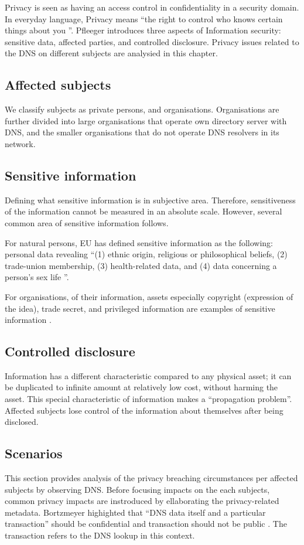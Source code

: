 Privacy is seen as having an access control in confidentiality in a security domain.
In everyday language, Privacy means ``the right to control who knows certain things about you \cite{securityincomputing}''.
Pfleeger introduces three aspects of Information security: sensitive data, affected parties, and controlled disclosure.
Privacy issues related to the DNS on different subjects are analysied in this chapter.

\subsection{Affected subjects}
We classify subjects as private persons, and organisations. Organisations are further divided into large organisations that operate own directory server with DNS, and the smaller organisations that do not operate DNS resolvers in its network.

\subsection{Sensitive information}\label{sensitiveinformation}
Defining what sensitive information is in subjective area.
Therefore, sensitiveness of the information cannot be measured in an absolute scale. However, several common area of sensitive information follows.

For natural persons, EU has defined sensitive information as the following: personal data revealing ``(1) ethnic origin, religious or philosophical beliefs, (2) trade-union membership, (3) health-related data, and (4) data concerning a person's sex life \cite{GDPR}''.

For organisations, of their information, assets especially copyright (expression of the idea), trade secret, and privileged information are examples of sensitive information \cite{securityincomputing}.

\subsection{Controlled disclosure}
Information has a different characteristic compared to any physical asset; it can be duplicated to infinite amount at relatively low cost, without harming the asset.
This special characteristic of information makes a ``propagation problem''.
Affected subjects lose control of the information about themselves after being disclosed.

\subsection{Scenarios}
This section provides analysis of the privacy breaching circumstances per affected subjects by observing DNS. Before focusing impacts on the each subjects, common privacy impacts are instroduced by ellaborating the privacy-related metadata.
Bortzmeyer highighted that ``DNS data itself and a particular transaction'' should be confidential and transaction should not be public \cite{rfc7626}. The transaction refers to the DNS lookup in this context.

